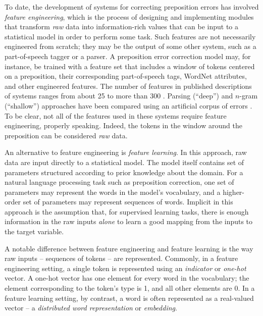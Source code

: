 To date, the development of systems for correcting preposition errors has involved \textit{feature engineering}, which is the process of designing and implementing modules that transform \textit{raw} data into information-rich values that can be input to a statistical model in order to perform some task.  Such features are not necessarily engineered from scratch; they may be the output of some other system, such as a part-of-speech tagger or a parser.  A preposition error correction model may, for instance, be trained with a feature set that includes a window of tokens centered on a preposition, their corresponding part-of-speech tags, WordNet attributes, and other engineered features.  The number of features in published descriptions of systems ranges from about 25   \cite{han2004detecting,chodorow2007detection,tetreault2008native,tetreault2008ups,han2010using,tetreault2010using} to more than 300  \cite{de2007automatically}.
Parsing (``deep'') and $n$-gram (``shallow'') approaches have been compared using an artificial corpus of errors \cite{wagner2007comparative}.  To be clear, not all of the features used in these systems require feature engineering, properly speaking.  Indeed, the tokens in the window around the preposition can be considered \textit{raw} data.

An alternative to feature engineering is \textit{feature learning}.  In this approach, raw data are input directly to a statistical model.  The model itself contains set of parameters structured according to prior knowledge about the domain.  For a natural language processing task such as preposition correction, one set of parameters may represent the words in the model's vocabulary, and a higher-order set of parameters may represent sequences of words.  Implicit in this approach  is the assumption that, for supervised learning tasks, there is enough information in the raw inputs \textit{alone} to learn a good mapping from the inputs to the target variable.  

A notable difference between feature engineering and feature learning is the way raw inputs -- sequences of tokens -- are represented.  Commonly, in a feature engineering setting, a single token is represented using an \textit{indicator} or \textit{one-hot} vector.  A one-hot vector has one element for every word in the vocabulary; the element corresponding to the token's type is 1, and all other elements are 0.  In a feature learning setting, by contrast, a word is often represented as a real-valued vector -- a \textit{distributed word representation} or \textit{embedding}.

